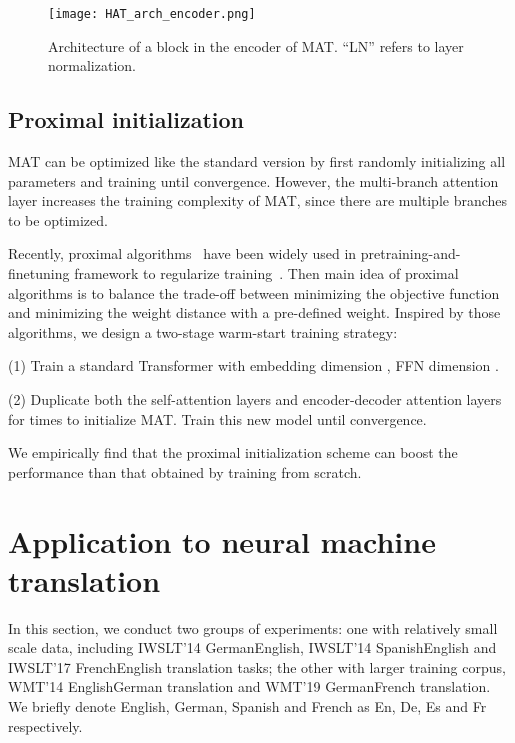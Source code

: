 \documentclass{article}
\begin{document}
\begin{figure}[!htbp]
\centering
\texttt{[image: HAT\_arch\_encoder.png]}
\vspace{-3mm}
\caption{Architecture of a block in the encoder of MAT. ``LN'' refers to layer normalization.}
\label{fig:arch_multi_branch}
\vspace{-3mm}
\end{figure}

\subsection{Proximal initialization}\label{sec:prox_init}
MAT can be optimized like the standard version by first randomly initializing all parameters and  training until convergence. However, the multi-branch attention layer increases the training complexity of MAT, since there are multiple branches to be optimized.

Recently, proximal algorithms~\cite{neal2013proximal} have been widely used in pretraining-and-finetuning framework to regularize training~\cite{jiang2019smart}. Then main idea of proximal algorithms is to balance the trade-off between minimizing the objective function and minimizing the weight distance with a pre-defined weight. Inspired by those algorithms, we design a two-stage warm-start training strategy:

\noindent(1) Train a standard Transformer with embedding dimension , FFN dimension .

\noindent(2) Duplicate both the self-attention layers and encoder-decoder attention layers for  times to initialize MAT. Train this new model until convergence.
 
We empirically find that the proximal initialization scheme can boost the performance than that obtained by training from scratch.

\section{Application to neural machine translation}
In this section, we conduct two groups of experiments: one with relatively small scale data, including IWSLT'14 GermanEnglish, IWSLT'14 SpanishEnglish and IWSLT'17 FrenchEnglish translation tasks; the other with larger training corpus, WMT'14 EnglishGerman translation and WMT'19 GermanFrench translation. We briefly denote English, German, Spanish and French as En, De, Es and Fr respectively.   
\end{document}
